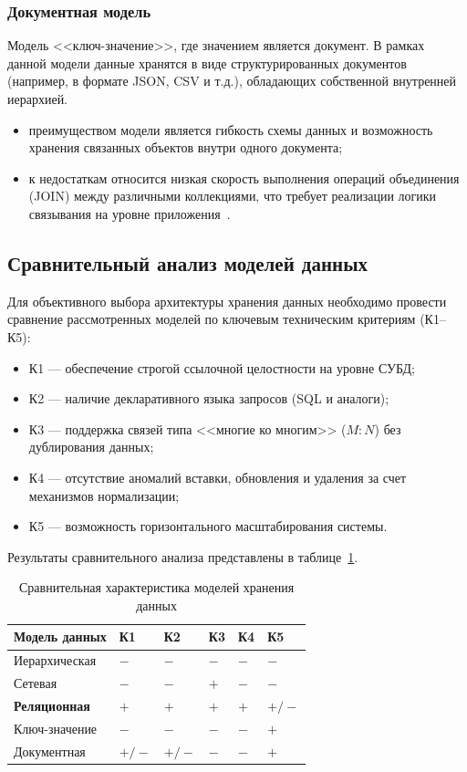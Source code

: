 \subsubsection{Документная модель}
Модель <<ключ-значение>>, где значением является документ.
В рамках данной модели данные хранятся в виде структурированных документов (например, в формате JSON, CSV и т.д.), обладающих собственной внутренней иерархией.
\begin{itemize}
	\item преимуществом модели является гибкость схемы данных и возможность хранения связанных объектов внутри одного документа;
	\item к недостаткам относится низкая скорость выполнения операций объединения (JOIN) между различными коллекциями, что требует реализации логики связывания на уровне приложения~\cite{avrunev, komarov}.
\end{itemize}

\subsection{Сравнительный анализ моделей данных}

Для объективного выбора архитектуры хранения данных необходимо провести сравнение рассмотренных моделей по ключевым техническим критериям (К1--К5):
\begin{itemize}
	\item К1 --- обеспечение строгой ссылочной целостности на уровне СУБД;
	\item К2 --- наличие декларативного языка запросов (SQL и аналоги);
	\item К3 --- поддержка связей типа <<многие ко многим>> ($M:N$) без дублирования данных;
	\item К4 --- отсутствие аномалий вставки, обновления и удаления за счет механизмов нормализации;
	\item К5 --- возможность горизонтального масштабирования системы.
\end{itemize}

Результаты сравнительного анализа представлены в таблице~\ref{tab:models_comp}.

\begin{table}[H]
	\centering
	\caption{Сравнительная характеристика моделей хранения данных}
	\label{tab:models_comp}
	\begin{tabularx}{\textwidth}{|l|X|X|X|X|X|}
		\hline
		\textbf{Модель данных} & \textbf{К1} & \textbf{К2} & \textbf{К3} & \textbf{К4} & \textbf{К5} \\
		\hline
		Иерархическая & $-$ & $-$ & $-$ & $-$ & $-$ \\
		\hline
		Сетевая & $-$ & $-$ & $+$ & $-$ & $-$ \\
		\hline
		\textbf{Реляционная} & $+$ & $+$ & $+$ & $+$ & $+/-$ \\
		\hline
		Ключ-значение & $-$ & $-$ & $-$ & $-$ & $+$ \\
		\hline
		Документная & $+/-$ & $+/-$ & $-$ & $-$ & $+$ \\
		\hline
	\end{tabularx}
\end{table}

